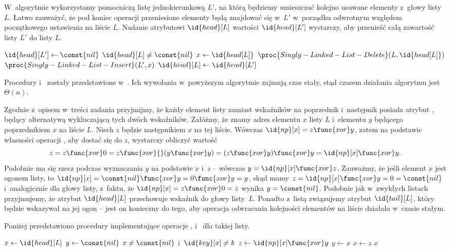\exercise %
W~algorytmie wykorzystamy pomocniczą listę jednokierunkową $L'$, na którą będziemy umieszczać kolejno usuwane elementy z~głowy listy $L$. Łatwo zauważyć, że pod koniec operacji przeniesione elementy będą znajdować się w~$L'$ w~porządku odwrotnym względem początkowego ustawienia na liście $L$. Nadanie atrybutowi $\id{head}[L]$ wartości $\id{head}[L']$ wystarczy, aby przenieść całą zawartość listy $L'$ do listy $L$.
\begin{codebox}
\li	$\id{head}[L']\gets\const{nil}$
\li	\While $\id{head}[L]\ne\const{nil}$
\li		\Do
			$x\gets\id{head[L]}$
\li			$\proc{Singly-Linked-List-Delete}(L,\id{head[L]})$
\li			$\proc{Singly-Linked-List-Insert}(L',x)$
		\End
\li	$\id{head}[L]\gets\id{head}[L']$
\end{codebox}

Procedury  i~ zostały przedstawione w~. Ich wywołania w~powyższym algorytmie zajmują czas stały, stąd czasem działania algorytmu jest $\Theta(n)$.

\exercise %
Zgodnie z~opisem w~treści zadania przyjmijmy, że każdy element listy zamiast wskaźników na poprzednik i~następnik posiada atrybut , będący alternatywą wykluczającą tych dwóch wskaźników. Załóżmy, że znamy adres elementu $x$ listy $L$ i~elementu $y$ będącego poprzednikiem $x$ na liście $L$. Niech $z$ będzie następnikiem $x$ na tej liście. Wówczas $\id{np}[x]=z\func{xor}y$, zatem na podstawie własności operacji , aby dostać się do $z$, wystarczy obliczyć wartość
\[
    z = z\func{xor}0 = z\func{xor}{}(y\func{xor}y) = (z\func{xor}y)\func{xor}y = \id{np}[x]\func{xor}y.
\]
Podobnie ma się rzecz podczas wyznaczania $y$ na podstawie $x$ i~$z$ -- wówczas $y=\id{np}[x]\func{xor}z$. Zauważmy, że jeśli element $x$ jest ogonem listy, to $\id{np}[x]=\const{nil}\func{xor}y=0\func{xor}y=y$, skąd mamy $z=\id{np}[x]\func{xor}y=0=\const{nil}$ i~analogicznie dla głowy listy, z~faktu, że $\id{np}[x]=z\func{xor}0=z$ wynika $y=\const{nil}$. Podobnie jak w~zwykłych listach przyjmujemy, że atrybut $\id{head}[L]$ przechowuje wskaźnik do głowy listy~$L$. Ponadto z~listą związujemy atrybut $\id{tail}[L]$, który będzie wskazywał na jej ogon -- jest on konieczny do tego, aby operacja odwracania kolejności elementów na liście działała w~czasie stałym.

Poniżej przedstawiono procedury implementujące operacje ,  i~ dla takiej listy.
\begin{codebox}
\li	$x\gets\id{head}[L]$
\li	$y\gets\const{nil}$
\li	\While $x\ne\const{nil}$ i~$\id{key}[x]\ne k$
\li		\Do
			$z\gets\id{np}[x]\func{xor}y$
\li			$y\gets x$
\li			$x\gets z$
		\End
\li	\Return $x$
\end{codebox}

